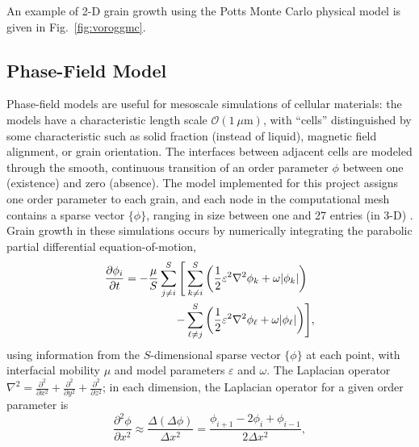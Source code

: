 \documentclass[11pt]{article}
\begin{document}
\begin{multicols*}{2}
An example of 2-D grain growth using the Potts Monte Carlo physical model is given in Fig.~\ref{fig:voroggmc}.

\subsection*{Phase-Field Model}
Phase-field models are useful for mesoscale simulations of cellular materials:
the models have a characteristic length scale $\mathcal{O}(1\ \mu\mathrm{m})$, with ``cells'' distinguished by some characteristic such as solid fraction (instead of liquid), magnetic field alignment, or grain orientation.
The interfaces between adjacent cells are modeled through the smooth, continuous transition of an order parameter $\phi$ between one (existence) and zero (absence).
The model implemented for this project assigns one order parameter to each grain, and each node in the computational mesh contains a sparse vector $\{\phi\}$, ranging in size between one and 27 entries (in 3-D) \cite{Steinbach1999}.
Grain growth in these simulations occurs by numerically integrating the parabolic partial differential equation-of-motion,
\begin{align}
\frac{\partial\phi_i}{\partial t} = -\frac{\mu}{S}\sum\limits_{j\neq i}^S\Bigg[
  &\sum\limits_{k\neq i}^S\bigg(\frac{1}{2}\varepsilon^2\nabla^2\phi_k+\omega|\phi_k|\bigg)\notag\\
  -&\sum\limits_{\ell\neq j}^S\bigg(\frac{1}{2}\varepsilon^2\nabla^2\phi_\ell+\omega|\phi_\ell|\bigg)\Bigg],\label{eqn:pf}
\end{align}
using information from the $S$-dimensional sparse vector $\{\phi\}$ at each point, with interfacial mobility $\mu$ and model parameters $\varepsilon$ and $\omega$.
The Laplacian operator $\nabla^2 = \frac{\partial^2}{\partial x^2} + \frac{\partial^2}{\partial y^2} + \frac{\partial^2}{\partial z^2}$;
in each dimension, the Laplacian operator for a given order parameter is
\begin{equation}
\frac{\partial^2\phi}{\partial x^2} \approx \frac{\Delta(\Delta\phi)}{\Delta x^2} = \frac{\phi_{i+1} - 2\phi_i + \phi_{i-1}}{2\Delta x^2},\label{eqn:laplacian}
\end{equation}


\end{multicols*}
\end{document}
